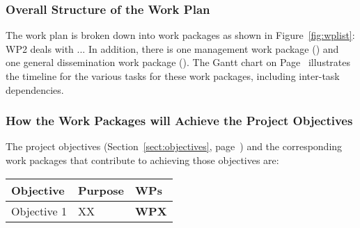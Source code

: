 \documentclass[noworkareas,deliverables,keys]{euproposal}                  %
\begin{document}
\begin{proposal}

\subsubsection*{Overall Structure of the Work Plan}

The work plan is broken down into  work packages as shown in
Figure~\ref{fig:wplist}: WP2 deals with ...  In addition, there is one management work
package () and one general dissemination work package
(). The Gantt chart on Page~\pageref{fig:gantt} illustrates the timeline for
the various tasks for these work packages, including inter-task dependencies.

\subsubsection*{How the Work Packages will Achieve the Project Objectives}
\label{sssec:how_the_work_packages_will_achieve}


The project objectives (Section~\ref{sect:objectives},
page~\pageref{sect:objectives}) and the corresponding work
packages that contribute to achieving those objectives are:

\begin{center}
\begin{tabular}{|l|l|l|}\hline
\textbf{Objective} & \textbf{Purpose} & \textbf{WPs} \\\hline \hline
Objective 1 & XX & \textbf{WPX} \\\hline
\end{tabular}
\end{center}


\end{proposal}
\end{document}

